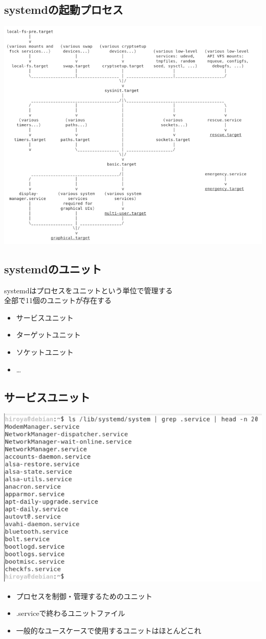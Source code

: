 \documentclass[mingoth,a4paper]{jsarticle}
\begin{document}
\subsection{systemdの起動プロセス}
\includegraphics[keepaspectratio,width=0.7\hsize]{image201905-kansai/systemdboot01_gray.png}

\subsection{systemdのユニット}
systemdはプロセスをユニットという単位で管理する
\\
全部で11個のユニットが存在する
\begin{itemize}
 \item サービスユニット
 \item ターゲットユニット
 \item ソケットユニット
 \item …
\end{itemize}

\subsection{サービスユニット}
\includegraphics[keepaspectratio,width=0.5\hsize]{image201905-kansai/serviceunit01_gray.png}
\begin{itemize}
 \item プロセスを制御・管理するためのユニット
 \item .serviceで終わるユニットファイル
 \item 一般的なユースケースで使用するユニットはほとんどこれ
\end{itemize}
\end{document}
